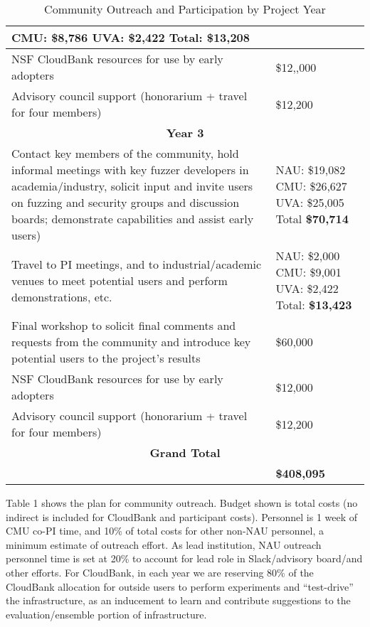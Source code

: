 \documentclass[12pt]{article}
\begin{document}
\begin{table}
\begin{tabular}{|p{12cm}|p{3cm}|}
                                                       CMU: \$8,786
                                                       UVA:  \$2,422
                                                       Total: \textbf{\$13,208}\\
    \hline
    NSF CloudBank resources for use by early adopters & \$12,,000 \\
    \hline 
    Advisory council support (honorarium + travel for four members) & \$12,200 \\    
    \hline
    \hline
    \multicolumn{2}{c}{{\bf Year 3}} \\
    \hline
    \hline
   Contact key members of the community, hold informal meetings with
    key fuzzer developers in academia/industry, solicit input and
    invite users
    on fuzzing and security groups and discussion boards; demonstrate
    capabilities and assist early users) &  NAU:   \$19,082 CMU: \$26,627 UVA: \$25,005
                                                      Total \textbf{\$70,714} \\
    \hline
    Travel to PI meetings, and to industrial/academic venues to meet
    potential users and perform demonstrations, etc. & NAU: \$2,000
                                                       CMU: \$9,001
                                                       UVA:  \$2,422
                                                       Total: \textbf{\$13,423}\\
    \hline    
    Final workshop to solicit final comments and requests from the
    community and introduce key potential users to the project’s
    results & \$60,000 \\
    \hline
    NSF CloudBank resources for use by early adopters & \$12,000 \\
    \hline 
    Advisory council support (honorarium + travel for four members) & \$12,200 \\    
    \hline
    \hline
    \multicolumn{2}{c}{{\bf Grand Total}} \\
    \hline
                   &     {\bf \$408,095} \\
                     \hline
 
  \end{tabular}
\label{outreach}
  \caption{Community Outreach and Participation by Project Year}
  
\end{table}


Table 1 shows the plan for community
outreach.   Budget shown is total costs 
 (no indirect is included for CloudBank and participant costs).   Personnel is 1 week of CMU co-PI time, and 10\%
of total costs for other non-NAU personnel, a
minimum estimate of outreach effort.  As lead institution, NAU
outreach personnel time is set at 20\% to account for lead role in
Slack/advisory board/and other efforts.  For CloudBank, in each year we
are reserving 80\% of the CloudBank allocation for outside users to
perform experiments and ``test-drive'' the infrastructure, as an
inducement to learn and contribute suggestions to the
evaluation/ensemble portion of infrastructure.
\end{document}
